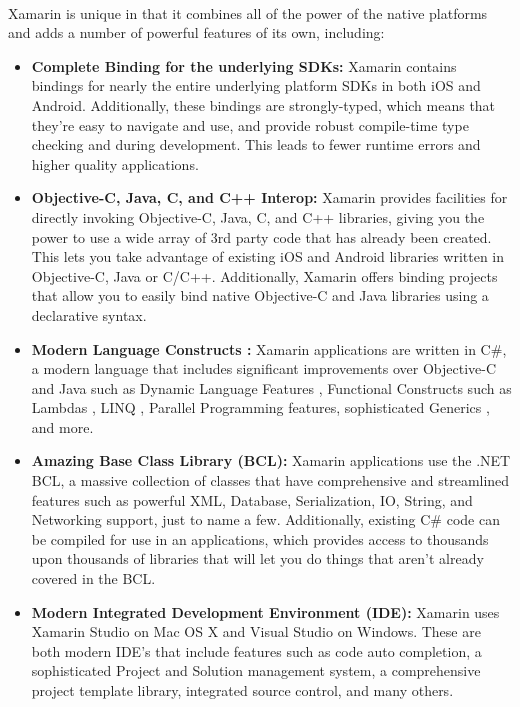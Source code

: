 \paragraph{}
 Xamarin is unique in that it combines all of the power of the native platforms and adds a number of powerful features of its own, including:


 \begin{itemize}


   \item \textbf{ Complete Binding for the underlying SDKs:}   Xamarin contains bindings for nearly the entire underlying platform SDKs in both iOS and Android. Additionally, these bindings are strongly-typed, which means that they’re easy to navigate and use, and provide robust compile-time type checking and during development. This leads to fewer runtime errors and higher quality applications.

   \item \textbf{Objective-C, Java, C, and C++ Interop:}  Xamarin provides facilities for directly invoking Objective-C, Java, C, and C++ libraries, giving you the power to use a wide array of 3rd party code that has already been created. This lets you take advantage of existing iOS and Android libraries written in Objective-C, Java or C/C++. Additionally, Xamarin offers binding projects that allow you to easily bind native Objective-C and Java libraries using a declarative syntax.

   \item \textbf{Modern Language Constructs :}     Xamarin applications are written in C\#, a modern language that includes significant improvements over Objective-C and Java such as Dynamic Language Features , Functional Constructs such as Lambdas , LINQ , Parallel Programming features, sophisticated Generics , and more.

   \item \textbf{Amazing Base Class Library (BCL): }  Xamarin applications use the .NET BCL, a massive collection of classes that have comprehensive and streamlined features such as powerful XML, Database, Serialization, IO, String, and Networking support, just to name a few. Additionally, existing C\# code can be compiled for use in an applications, which provides access to thousands upon thousands of libraries that will let you do things that aren’t already covered in the BCL.

   \item \textbf{Modern Integrated Development Environment (IDE):}  Xamarin uses Xamarin Studio on Mac OS X and Visual Studio on Windows. These are both modern IDE’s that include features such as code auto completion, a sophisticated Project and Solution management system, a comprehensive project template library, integrated source control, and many others.


\end{itemize}
